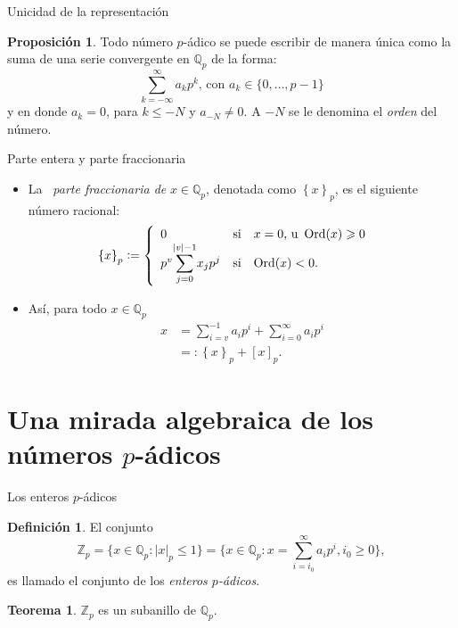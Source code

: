 \documentclass{beamer}
\theoremstyle{definition}
\numberwithin{equation}{section}
\newcommand{\marine}[1]{\textcolor{defColor}{#1}}
\newcommand{\orangee}[1]{\textcolor{thColor}{#1}}
\newtheorem{df}{\marine{Definición}}
\newtheorem{thh}{\orangee{Teorema}}
\newtheorem{pr}{\orangee{Proposición}}
\renewcommand{\geq}{\geqslant}
\renewcommand{\leq}{\leqslant}
\newcommand{\Qp}{\mathbb{Q}_p}
\newcommand{\Zp}{\mathbb{Z}_p}
\DeclareMathOperator{\ord}{Ord}
\begin{document}
\begin{frame}{Unicidad de la representación}
	\begin{pr}
		Todo número $p$-ádico se puede escribir de manera única como la suma de una serie convergente en  $\Qp$ de la forma:
		\begin{equation}
		\sum_{k=-\infty}^{\infty} a_{k} p^{k}\text{, con $a_k\in\{0,\dots,p-1\}$}	\label{eq:1}
		\end{equation}
		y en donde $a_k=0$, para $k\leq - N$ y $a_{-N}\neq 0$\label{ord_def_2}. A $-N$ se le denomina el \textit{orden} del número.
	\end{pr}
\end{frame}

\begin{frame}{Parte entera y parte fraccionaria}
	\begin{itemize}[<+- | alert@+>]
		
		\item La \textit{\ parte fraccionaria de }$x\in\Qp$, denotada como
		$\left\{  x\right\}  _{p}$, es el siguiente número racional:
		\[
		\left\{  x\right\}  _{p}:=\left\{
		\begin{array}
		[c]{llll}%
		0 & \text{si} & x=0\text{,}  \text{ u}\,  \, \ord (x)\geq0\\
		p^{v}
		{\displaystyle\sum\limits_{j=0}^{\left\vert v\right\vert -1}}
		
		x_{j}p^{j} & \text{si} & \ord (x)<0. &
		\end{array}
		\right.
		\]
		\item Así, para todo $x\in\mathbb{Q}_{p}$ 
		\begin{align*}
		x & =\sum_{i=v}^{-1}a_{i}p^{i}+\sum_{i=0}^{\infty}a_{i}p^{i}\\
		& =:\left\{ x\right\} _{p}+[x]_{p}.
		\end{align*}
	\end{itemize}

\end{frame}

\section{Una mirada algebraica de los números $p$-ádicos}

\begin{frame}{Los enteros $p$-ádicos}
	\begin{df}
		El conjunto
		\[
		\mathbb{Z}_{p} =\{x\in\Qp:|x|_{p}\leq1\}=\{x\in\Qp:x=\sum_{i=i_{0}}^{\infty} a_{i}p^{i},i_{0}\geq0\},
		\]
		es llamado el conjunto de los \textit{enteros $p$-ádicos}.
	\end{df}
\begin{thh}
	$\Zp$ es un subanillo de $\Qp$.
\end{thh}
\end{frame}
\end{document}

